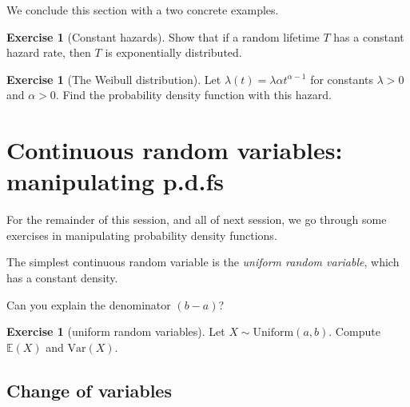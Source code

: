 \documentclass[11pt]{article}
\theoremstyle{definition}
\newtheorem{exercise}[]{Exercise}
\newcommand{\E}{\mathbb{E}}
\newcommand{\V}{\text{Var}}
\begin{document}
We conclude this section with a two concrete examples.
\begin{exercise}[Constant hazards]
Show that if a random lifetime $T$ has a constant hazard rate,
then $T$ is exponentially distributed.
\end{exercise}

\begin{exercise}[The Weibull distribution]
Let $\lambda(t) = \lambda \alpha t^{\alpha -1}$ for constants $\lambda > 0$
and $\alpha > 0$.
Find the probability density function with this hazard.

\end{exercise}

\section{Continuous random variables: manipulating p.d.fs}

For the remainder of this session, and all of next session,
we go through some exercises in manipulating probability density functions.

The simplest continuous random variable is the \textit{uniform random variable},
which has a constant density.


Can you explain the denominator $(b - a)$?

\begin{exercise}[uniform random variables]
Let $X \sim \text{Uniform}(a, b)$. Compute $\E(X)$ and $\V(X)$.
\end{exercise}

\subsection{Change of variables}
\end{document}
